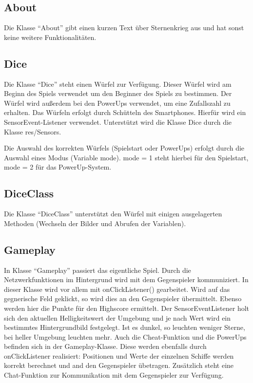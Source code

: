 \documentclass[11pt]{article} %
\begin{document}
\subsection{About}
Die Klasse \enquote{About} gibt einen kurzen Text über Sternenkrieg aus und hat sonst keine weitere Funktionalitäten.

\subsection{Dice}
Die Klasse \enquote{Dice} steht einen Würfel zur Verfügung. Dieser Würfel wird am Beginn des Spiels verwendet um den Beginner des Spiels zu bestimmen. Der Würfel wird außerdem bei den PowerUps verwendet, um eine Zufallszahl zu erhalten.
Das Würfeln erfolgt durch Schütteln des Smartphones. Hierfür wird ein SensorEvent-Listener verwendet. Unterstützt wird die Klasse Dice durch die Klasse res/Sensors.

Die Auswahl des korrekten Würfels (Spielstart oder PowerUps) erfolgt durch die Auswahl eines Modus (Variable mode). mode = 1 steht hierbei für den Spielstart, mode = 2 für das PowerUp-System.

\subsection{DiceClass}
Die Klasse \enquote{DiceClass} unterstützt den Würfel mit einigen ausgelagerten Methoden (Wechseln der Bilder und Abrufen der Variablen).

\subsection{Gameplay}
In Klasse \enquote{Gameplay} passiert das eigentliche Spiel. Durch die Netzwerkfunktionen im Hintergrund wird mit dem Gegenspieler kommuniziert. In dieser Klasse wird vor allem mit onClickListener() gearbeitet. Wird auf das gegnerische Feld geklickt, so wird dies an den Gegenspieler übermittelt. Ebenso werden hier die Punkte für den Highscore ermittelt.
Der SensorEventListener holt sich den aktuellen Helligkeitswert der Umgebung und je nach Wert wird ein bestimmtes Hintergrundbild festgelegt. Ist es dunkel, so leuchten weniger Sterne, bei heller Umgebung leuchten mehr.
Auch die Cheat-Funktion und die PowerUps befinden sich in der Gameplay-Klasse. Diese werden ebenfalls durch onClickListener realisiert: Positionen und Werte der einzelnen Schiffe werden korrekt berechnet und and den Gegenspieler übetragen.
Zusätzlich steht eine Chat-Funktion zur Kommunikation mit dem Gegenspieler zur Verfügung.
\end{document}
